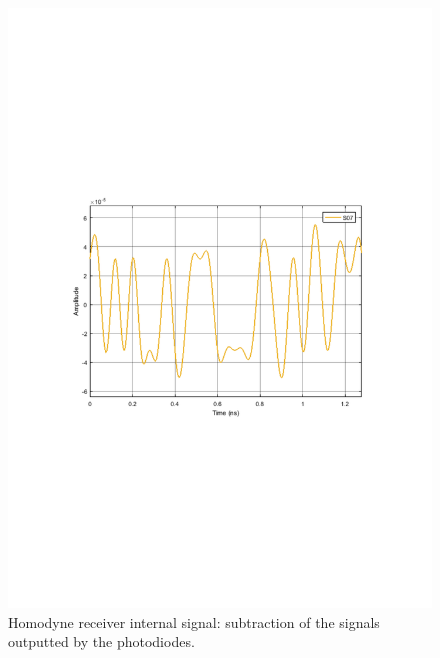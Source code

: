 \documentclass[a4paper]{article}
\begin{document}
\begin{figure}[H]
\centering
\includegraphics[width=\linewidth, trim= 0mm 95mm 0mm 95mm, clip]{subtract.pdf}
\caption{Homodyne receiver internal signal: subtraction of the signals outputted by the photodiodes.}
\label{fig:subtract}
\end{figure}
\end{document}
